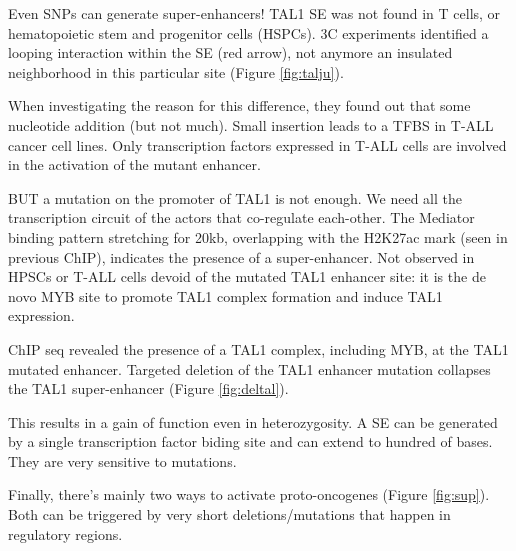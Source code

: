 Even SNPs can generate super-enhancers! TAL1 SE was not found in T cells, or hematopoietic stem and progenitor cells (HSPCs). 3C experiments identified a looping interaction within the SE (red arrow), not anymore an insulated neighborhood in this particular site (Figure \ref{fig:talju}).

When investigating the reason for this difference, they found out that some nucleotide addition (but not much). Small insertion leads to a TFBS in T-ALL cancer cell lines. Only transcription factors expressed in T-ALL cells are involved in the activation of the mutant enhancer.

BUT a mutation on the promoter of TAL1 is not enough. We need all the transcription circuit of the actors that co-regulate each-other. The Mediator binding pattern stretching for 20kb, overlapping with the H2K27ac mark (seen in previous ChIP), indicates the presence of a super-enhancer. Not observed in HPSCs or T-ALL cells devoid of the mutated TAL1 enhancer site: it is the de novo MYB site to promote TAL1 complex formation and induce TAL1 expression.

ChIP seq revealed the presence of a TAL1 complex, including MYB, at the TAL1 mutated enhancer.
Targeted deletion of the TAL1 enhancer mutation collapses the TAL1 super-enhancer (Figure \ref{fig:deltal}).

This results in a gain of function even in heterozygosity. A SE can be generated by a single transcription factor biding site and can extend to hundred of bases. They are very sensitive to mutations.

Finally, there's mainly two ways to activate proto-oncogenes (Figure \ref{fig:sup}). Both can be triggered by very short deletions/mutations that happen in regulatory regions.

